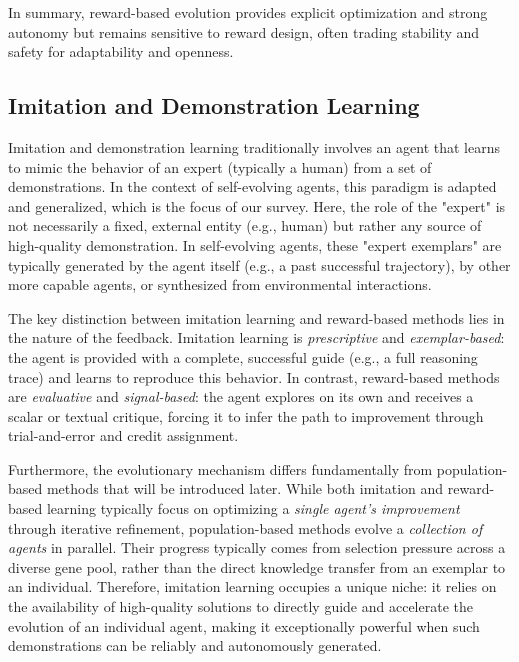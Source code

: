 In summary, reward-based evolution provides explicit optimization and strong autonomy but remains sensitive to reward design, often trading stability and safety for adaptability and openness.



\subsection{Imitation and Demonstration Learning}


Imitation and demonstration learning traditionally involves an agent that learns to mimic the behavior of an expert (typically a human) from a set of demonstrations. In the context of self-evolving agents, this paradigm is adapted and generalized, which is the focus of our survey. Here, the role of the "expert" is not necessarily a fixed, external entity (e.g., human) but rather any source of high-quality demonstration. In self-evolving agents, these "expert exemplars" are typically generated by the agent itself (e.g., a past successful trajectory), by other more capable agents, or synthesized from environmental interactions.

The key distinction between imitation learning and reward-based methods lies in the nature of the feedback. Imitation learning is \textit{prescriptive} and \textit{exemplar-based}: the agent is provided with a complete, successful guide (e.g., a full reasoning trace) and learns to reproduce this behavior. In contrast, reward-based methods are \textit{evaluative} and \textit{signal-based}: the agent explores on its own and receives a scalar or textual critique, forcing it to infer the path to improvement through trial-and-error and credit assignment.

Furthermore, the evolutionary mechanism differs fundamentally from population-based methods that will be introduced later. While both imitation and reward-based learning typically focus on optimizing a \textit{single agent's improvement} through iterative refinement, population-based methods evolve a \textit{collection of agents} in parallel. Their progress typically comes from selection pressure across a diverse gene pool, rather than the direct knowledge transfer from an exemplar to an individual. Therefore, imitation learning occupies a unique niche: it relies on the availability of high-quality solutions to directly guide and accelerate the evolution of an individual agent, making it exceptionally powerful when such demonstrations can be reliably and autonomously generated.





